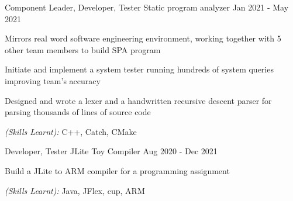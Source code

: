 

\begin{cventries}

  \cventry
    {Component Leader, Developer, Tester} %
    {Static program analyzer} %
    {} %
    {Jan 2021 - May 2021} %
    {
      \begin{cvitems} %
        \item {Mirrors real word software engineering environment, working together with 5 other team members to build SPA program}
        \item {Initiate and implement a system tester running hundreds of system queries improving team's accuracy}
        \item {Designed and wrote a lexer and a handwritten recursive descent parser for parsing thousands of lines of source code}
        \item {\textit{(Skills Learnt):} C++, Catch, CMake}
      \end{cvitems}
    }


%

  \cventry
    {Developer, Tester} %
    {JLite Toy Compiler} %
    {} %
    {Aug 2020 - Dec 2021} %
    {
      \begin{cvitems} %
        \item {Build a JLite to ARM compiler for a programming assignment}
        \item {\textit{(Skills Learnt):} Java, JFlex, cup, ARM}
      \end{cvitems}
    }


\end{cventries}
